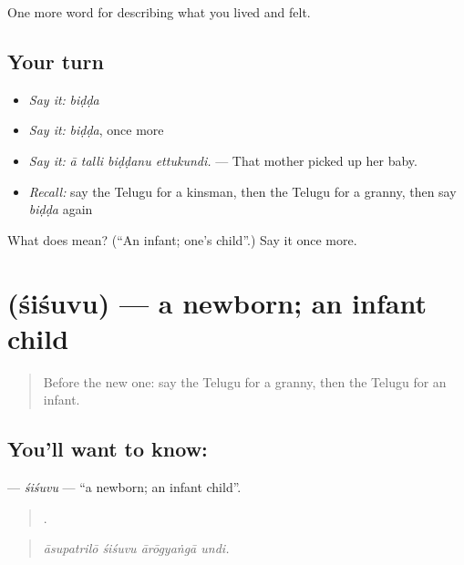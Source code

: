 \begin{grammarlens}[title={What you've built}]
One more word for describing what you lived and felt.
\end{grammarlens}

\subsection*{Your turn}
\begin{itemize}
\raggedright
  \item \emph{Say it:} \emph{biḍḍa}
  \item \emph{Say it:} \emph{biḍḍa}, once more
  \item \emph{Say it:} \emph{ā talli biḍḍanu ettukundi.} — That mother picked up her baby.
  \item \emph{Recall:} say the Telugu for a kinsman, then the Telugu for a granny, then say \emph{biḍḍa} again
\end{itemize}

\begin{tcolorbox}[breakable,colback=teal!4,colframe=teal!35!black,title={Before you move on}]
What does  mean? (\textquotedblleft{}An infant; one's child\textquotedblright{}.) Say it once more.
\end{tcolorbox}
\section[\texorpdfstring{\te{శిశువు} (śiśuvu)}{శిశువు (śiśuvu)}]{ (śiśuvu) — a newborn; an infant child}

\label{lesson:TE-C531-sisuvu}



\begin{quote}
Before the new one: say the Telugu for a granny, then the Telugu for an infant.
\end{quote}

\subsection*{You'll want to know: }
\textbf{} — \emph{śiśuvu} — \textquotedblleft{}a newborn; an infant child\textquotedblright{}.

\begin{quote}
   .
\end{quote}

\begin{quote}
\emph{āsupatrilō śiśuvu ārōgyaṅgā undi.}
\end{quote}


